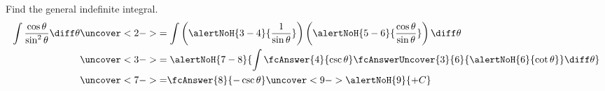 \begin{frame}
\begin{example}%
Find the general indefinite integral.
\abovedisplayskip=0pt
\belowdisplayskip=0pt
\abovedisplayshortskip=0pt
\belowdisplayshortskip=0pt
\begin{align*}
\int \frac{\cos \theta}{\sin^2 \theta} \diff \theta %
& \uncover<2->{= \int \left( \alertNoH{ 3-4}{\frac{1}{\sin \theta}}\right) \left( \alertNoH{ 5-6}{\frac{\cos \theta}{\sin \theta}}\right)\diff \theta}\\
& \uncover<3->{= \alertNoH{ 7-8}{\int \fcAnswer{ 4}{\csc \theta} \fcAnswerUncover{3 }{6}{ \alertNoH{ 6}{\cot \theta}}\diff \theta}}\\
& \uncover<7->{=}\fcAnswer{8}{-\csc \theta} \uncover<9->{\alertNoH{ 9}{+ C}}
\end{align*}
\end{example}
\end{frame}
